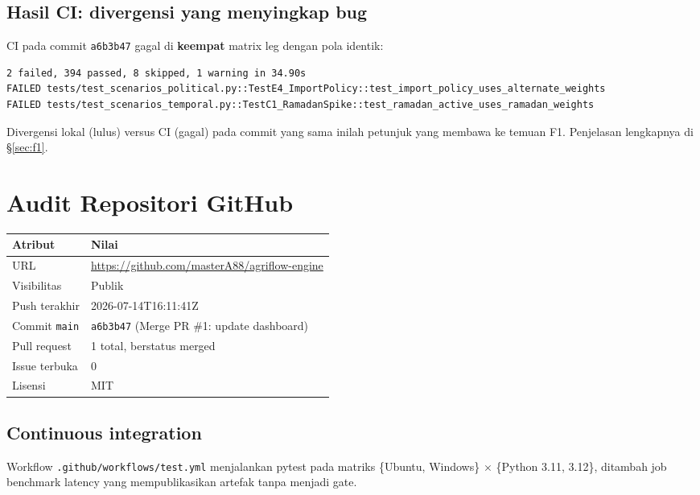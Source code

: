 \documentclass[11pt,a4paper]{article}
\newcommand{\code}[1]{\texttt{\small #1}}
\begin{document}
\subsection{Hasil CI: divergensi yang menyingkap bug}

CI pada commit \code{a6b3b47} gagal di \textbf{keempat} matrix leg dengan pola identik:

\begin{lstlisting}
2 failed, 394 passed, 8 skipped, 1 warning in 34.90s
FAILED tests/test_scenarios_political.py::TestE4_ImportPolicy::test_import_policy_uses_alternate_weights
FAILED tests/test_scenarios_temporal.py::TestC1_RamadanSpike::test_ramadan_active_uses_ramadan_weights
\end{lstlisting}

\noindent
Divergensi lokal (lulus) versus CI (gagal) pada commit yang sama inilah petunjuk yang membawa ke
temuan F1. Penjelasan lengkapnya di \S\ref{sec:f1}.

\section{Audit Repositori GitHub}

\begin{center}
\begin{tabular}{@{}p{4.2cm}p{10.8cm}@{}}
\toprule
\textbf{Atribut} & \textbf{Nilai} \\
\midrule
URL & \url{https://github.com/masterA88/agriflow-engine} \\
Visibilitas & Publik \\
Push terakhir & 2026-07-14T16:11:41Z \\
Commit \code{main} & \code{a6b3b47} (Merge PR \#1: update dashboard) \\
Pull request & 1 total, berstatus merged \\
Issue terbuka & 0 \\
Lisensi & MIT \\
\bottomrule
\end{tabular}
\end{center}

\subsection{Continuous integration}

Workflow \code{.github/workflows/test.yml} menjalankan pytest pada matriks
\{Ubuntu, Windows\} $\times$ \{Python 3.11, 3.12\}, ditambah job benchmark latency yang
mempublikasikan artefak tanpa menjadi gate.
\end{document}

